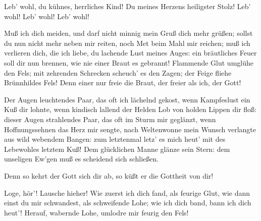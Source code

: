 \begin{drama}
Leb' wohl, du kühnes, herrliches Kind!
Du meines Herzens heiligster Stolz!
Leb' wohl! Leb' wohl! Leb' wohl!


Muß ich dich meiden,
und darf nicht minnig
mein Gruß dich mehr grüßen;
sollst du nun nicht mehr neben mir reiten,
noch Met beim Mahl mir reichen;
muß ich verlieren dich, die ich liebe,
du lachende Lust meines Auges:
ein bräutliches Feuer soll dir nun brennen,
wie nie einer Braut es gebrannt!
Flammende Glut umglühe den Fels;
mit zehrenden Schrecken
scheuch' es den Zagen;
der Feige fliehe Brünnhildes Fels!
Denn einer nur freie die Braut,
der freier als ich, der Gott!
 



Der Augen leuchtendes Paar,
das oft ich lächelnd gekost,
wenn Kampfeslust ein Kuß dir lohnte,
wenn kindisch lallend der Helden Lob
von holden Lippen dir floß:
dieser Augen strahlendes Paar,
das oft im Sturm mir geglänzt,
wenn Hoffnungssehnen das Herz mir sengte,
nach Weltenwonne mein Wunsch verlangte
aus wild webendem Bangen:
zum letztenmal
letz' es mich heut'
mit des Lebewohles letztem Kuß!
Dem glücklichen Manne
glänze sein Stern:
dem unseligen Ew'gen
muß es scheidend sich schließen.
 



Denn so kehrt der Gott sich dir ab,
so küßt er die Gottheit von dir!
 



Loge, hör'! Lausche hieher!
Wie zuerst ich dich fand, als feurige Glut,
wie dann einst du mir schwandest,
als schweifende Lohe;
wie ich dich band, bann ich dich heut'!
Herauf, wabernde Lohe,
umlodre mir feurig den Fels!
 



\end{drama}

